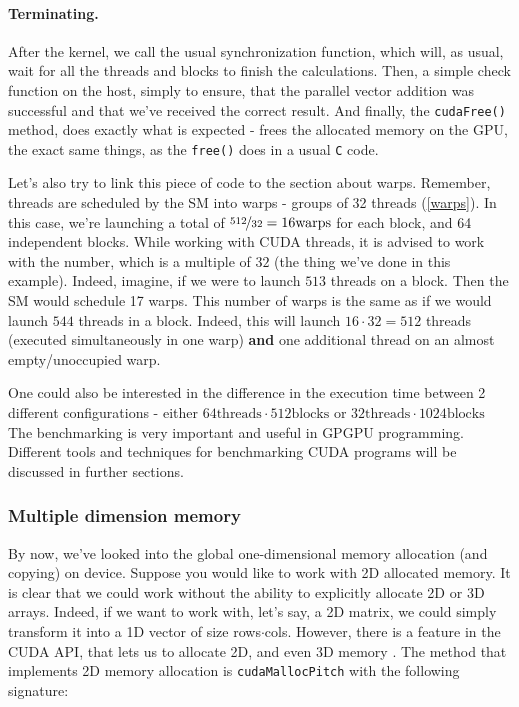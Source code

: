 \vspace{-0.8cm}
\paragraph{Terminating.} After the kernel, we call the usual synchronization function, which will, as usual, wait for all the threads and blocks 
to finish the calculations. 
Then, a simple check function on the host, simply to ensure, that the parallel vector addition was successful and that we've received the correct result.
And finally, the \verb|cudaFree()| method, does exactly what is expected - 
frees the allocated memory on the GPU, the exact same things, as the \verb|free()| does in a usual \verb|C| code.

Let's also try to link this piece of code to the section about warps. Remember, 
threads are scheduled by the SM into warps - groups of 32 threads (\autoref{warps}). 
In this case, we're launching a total of $\nicefrac{512}{32} = 16 \text{warps}$ for each 
block, and 64 independent blocks. While working with CUDA threads, it is advised to work with 
the number, which is a multiple of $32$ (the thing we've done in this example). Indeed, imagine, if we were to launch $513$ threads on a block.
Then the SM would schedule 17 warps. This number of warps is the same as if we would launch $544$ threads in a block.
Indeed, this will launch $16\cdot 32 = 512$ threads (executed simultaneously in one warp) \textbf{and} 
one additional thread on an almost empty/unoccupied warp. 

One could also be interested in the difference in the execution time between 2 different
 configurations - either $64\text{threads}\cdot 512\text{blocks}$ or $32\text{threads}\cdot 1024\text{blocks}$
 The benchmarking is very important and useful in GPGPU programming. Different tools and techniques for  
 benchmarking CUDA programs will be discussed in further sections.

\subsubsection{Multiple dimension memory}
By now, we've looked into the global one-dimensional 
memory allocation (and copying) on device. Suppose you would like to work 
with 2D allocated memory. It is clear that we could work without the ability to explicitly allocate 2D or 3D arrays. 
Indeed, if we want to work with, let's say, a 2D matrix, we could simply 
transform it into a 1D vector of size rows$\cdot$cols.
However, there is a feature in the CUDA API, that lets us to allocate 2D, and even 
3D memory \cite{MemoryAlignment}. 
The method that implements 2D memory allocation is \verb|cudaMallocPitch| with the following signature:


